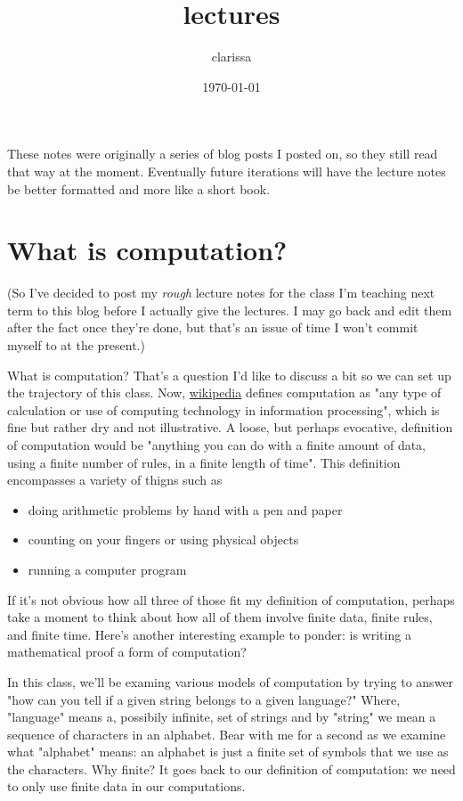 \documentclass[11pt]{article}
\author{clarissa}
\date{\today}
\title{lectures}
\begin{document}
\maketitle
\tableofcontents

These notes were originally a series of blog posts I posted on, so they still read that way at the moment. Eventually future iterations will have the lecture notes be better formatted and more like a short book.
\section{What is computation?}
\label{sec-1}
(So I've decided to post my \emph{rough} lecture notes for the class I'm teaching next term to this blog before I actually give the lectures. I may go back and edit them after the fact once they're done, but that's an issue of time I won't commit myself to at the present.)

What is computation? That's a question I'd like to discuss a bit so we can set up the trajectory of this class. Now, \href{http://en.wikipedia.org/wiki/Computation}{wikipedia} defines computation as "any type of calculation or use of computing technology in information processing", which is fine but rather dry and not illustrative. A loose, but perhaps evocative, definition of computation would be "anything you can do with a finite amount of data, using a finite number of rules, in a finite length of time". This definition encompasses a variety of thigns such as 
\begin{itemize}
\item doing arithmetic problems by hand with a pen and paper
\item counting on your fingers or using physical objects
\item running a computer program
\end{itemize}
If it's not obvious how all three of those fit my definition of computation, perhaps take a moment to think about how all of them involve finite data, finite rules, and finite time. Here's another interesting example to ponder: is writing a mathematical proof a form of computation?

In this class, we'll be examing various models of computation by trying to answer "how can you tell if a given string belongs to a given language?" Where, "language" means a, possibily infinite, set of strings and by "string" we mean a sequence of characters in an alphabet. Bear with me for a second as we examine what "alphabet" means: an alphabet is just a finite set of symbols that we use as the characters. Why finite? It goes back to our definition of computation: we need to only use finite data in our computations.
\end{document}
